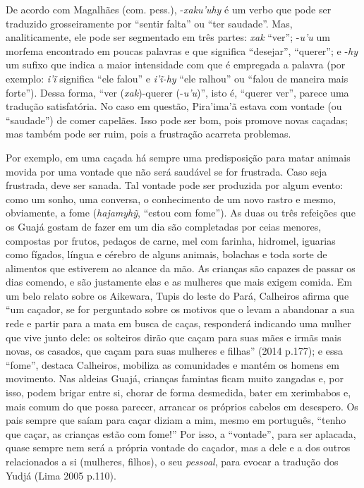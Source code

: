 De acordo com Magalhães (com. pess.), -\emph{xaku'uhy} é um verbo que
pode ser traduzido grosseiramente por ``sentir falta'' ou ``ter saudade''.
Mas, analiticamente, ele pode ser segmentado em três partes: \emph{xak}
``ver''; -\emph{u'u} um morfema encontrado em poucas palavras e que
significa ``desejar'', ``querer''; e -\emph{hy} um sufixo que indica a maior
intensidade com que é empregada a palavra (por exemplo: \emph{i'ĩ}
significa ``ele falou'' e \emph{i'ĩ-hy} ``ele ralhou'' ou ``falou de maneira
mais forte''). Dessa forma, ``ver (\emph{xak})-querer (-\emph{u'u})'', isto
é, ``querer ver'', parece uma tradução satisfatória. No caso em questão,
Pira'ima'ã estava com vontade (ou ``saudade'') de comer capelães. Isso
pode ser bom, pois promove novas caçadas; mas também pode ser ruim, pois
a frustração acarreta problemas.

Por exemplo, em uma caçada há sempre uma predisposição para matar
animais movida por uma vontade que não será saudável se for frustrada.
Caso seja frustrada, deve ser sanada. Tal vontade pode ser produzida por
algum evento: como um sonho, uma conversa, o conhecimento de um novo
rastro e mesmo, obviamente, a fome (\emph{hajamyhỹ}, ``estou com
fome''). As duas ou três refeições que os Guajá gostam de fazer em um
dia são completadas por ceias menores, compostas por frutos, pedaços de
carne, mel com farinha, hidromel, iguarias como fígados, língua e
cérebro de alguns animais, bolachas e toda sorte de alimentos que
estiverem ao alcance da mão. As crianças são capazes de passar os dias
comendo, e são justamente elas e as mulheres que mais exigem comida. Em
um belo relato sobre os Aikewara, Tupis do leste do Pará, Calheiros
afirma que ``um caçador, se for perguntado sobre os motivos que o levam
a abandonar a sua rede e partir para a mata em busca de caças,
responderá indicando uma mulher que vive junto dele: os solteiros dirão
que caçam para suas mães e irmãs mais novas, os casados, que caçam para
suas mulheres e filhas'' (2014 p.177); e essa ``fome'', destaca
Calheiros, mobiliza as comunidades e mantém os homens em movimento. Nas
aldeias Guajá, crianças famintas ficam muito zangadas e, por isso, podem
brigar entre si, chorar de forma desmedida, bater em xerimbabos e, mais
comum do que possa parecer, arrancar os próprios cabelos em desespero.
Os pais sempre que saíam para caçar diziam a mim, mesmo em português,
``tenho que caçar, as crianças estão com fome!'' Por isso, a
``vontade'', para ser aplacada, quase sempre nem será a própria vontade
do caçador, mas a dele e a dos outros relacionados a si (mulheres,
filhos), o seu \emph{pessoal}, para evocar a tradução dos Yudjá (Lima
2005 p.110).

